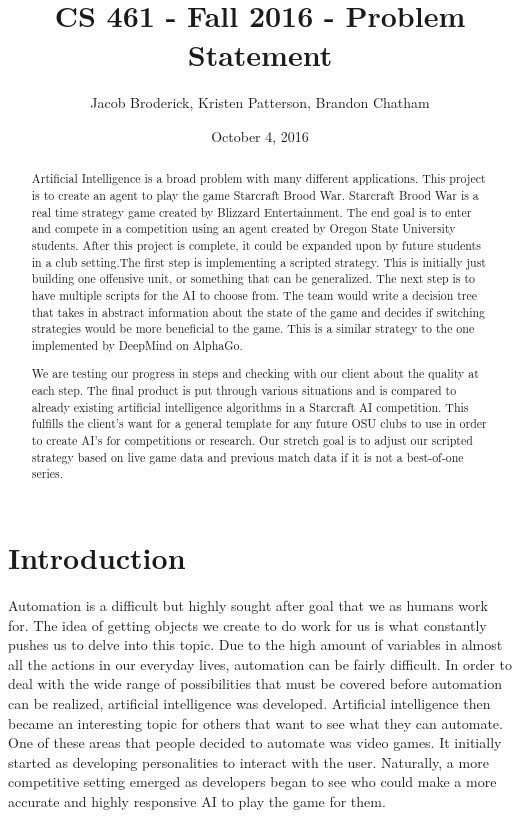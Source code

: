 \documentclass[10pt,letterpaper,onecolumn,draftclsnofoot]{IEEEtran}
\begin{document}
\begin{titlepage}
  \title{CS 461 - Fall 2016 - Problem Statement}
  \author{Jacob Broderick, Kristen Patterson, Brandon Chatham}
  \date{October 4, 2016}
  \maketitle
  \vspace{4cm}
  \begin{abstract}
  	\noindent 
  	Artificial Intelligence is a broad problem with many different applications. This project is to create an agent to play the game Starcraft Brood War. Starcraft Brood War is a real time strategy game created by Blizzard Entertainment. The end goal is to enter and compete in a competition using an agent created by Oregon State University students. After this project is complete, it could be expanded upon by future students in a club setting.The first step is implementing a scripted strategy. This is initially just building one offensive unit, or something that can be generalized. The next step is to have multiple scripts for the AI to choose from. The team would write a decision tree that takes in abstract information about the state of the game and decides if switching strategies would be more beneficial to the game. This is a similar strategy to the one implemented by DeepMind on AlphaGo.
  	
  	We are testing our progress in steps and checking with our client about the quality at each step. The final product is put through various situations and is compared to already existing artificial intelligence algorithms in a Starcraft AI competition. This fulfills the client’s want for a general template for any future OSU clubs to use in order to create AI’s for competitions or research. Our stretch goal is to adjust our scripted strategy based on live game data and previous match data if it is not a best-of-one series. 
  \end{abstract}
\end{titlepage}
\section{Introduction}
Automation is a difficult but highly sought after goal that we as humans work for. The idea of getting objects we create to do work for us is what constantly pushes us to delve into this topic. Due to the high amount of variables in almost all the actions in our everyday lives, automation can be fairly difficult. In order to deal with the wide range of possibilities that must be covered before automation can be realized, artificial intelligence was developed. Artificial intelligence then became an interesting topic for others that want to see what they can automate. One of these areas that people decided to automate was video games. It initially started as developing personalities to interact with the user. Naturally, a more competitive setting emerged as developers began to see who could make a more accurate and highly responsive AI to play the game for them.
\end{document}
